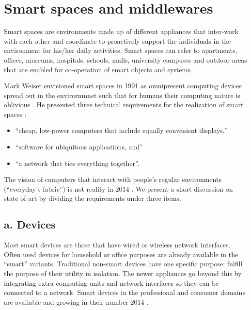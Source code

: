 \section{Smart spaces and middlewares}
\label{sec:smart_spaces}

Smart spaces are environments made up of different appliances that inter-work with each other and coordinate to proactively support the individuals in the environment for his/her daily activities. Smart spaces can refer to apartments, offices, museums, hospitals, schools, malls, university campuses and outdoor areas that are enabled for co-operation of smart objects and systems.

Mark Weiser envisioned smart spaces in 1991 as omnipresent computing devices spread out in the envirornmnet such that for humans their computing nature is oblivious \cite{Weiser1991}. He presented three technical requirements for the realization of smart spaces \cite{Weiser1991}\cite{pahl2014distributed}:

\begin{itemize}
  \item ``cheap, low-power computers that include equally convenient displays,''
  \item ``software for ubiquitous applications, and''
  \item ``a network that ties everything together''.
\end{itemize}

The vision of computers that interact with people's regular environments (``everyday's fabric'') is not reality in 2014 \cite{pahl2014distributed}. We present a short discussion on state of art by dividing the requirements under three items.

\subsection*{a. Devices}

Most smart devices are those that have wired or wireless network interfaces. Often used devices for household or office purposes are already available in the ``smart'' variants. Traditional non-smart devices have one specific purpose: fulfill the purpose of their utility in isolation. The newer appliances go beyond this by integrating extra computing units and network interfaces so they can be connected to a network. Smart devices in the professional and consumer domains are available and growing in their number 2014 \cite{pahl2014distributed}.

